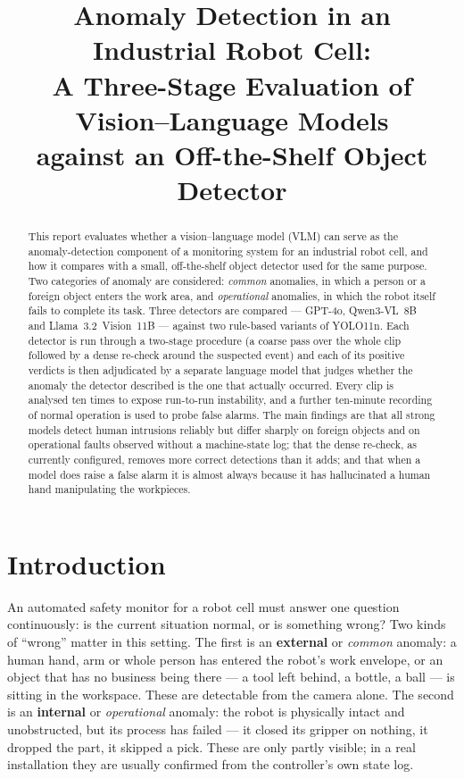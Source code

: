 \documentclass[11pt,a4paper]{article}
\title{Anomaly Detection in an Industrial Robot Cell:\\[4pt]
       A Three-Stage Evaluation of Vision--Language Models\\
       against an Off-the-Shelf Object Detector}
\author{}
\date{}
\begin{document}
\maketitle

\begin{abstract}
\noindent
This report evaluates whether a vision--language model (VLM) can serve as
the anomaly-detection component of a monitoring system for an industrial
robot cell, and how it compares with a small, off-the-shelf object
detector used for the same purpose. Two categories of anomaly are
considered: \emph{common} anomalies, in which a person or a foreign object
enters the work area, and \emph{operational} anomalies, in which the robot
itself fails to complete its task. Three detectors are compared --- GPT-4o,
Qwen3-VL~8B and Llama~3.2~Vision~11B --- against two rule-based variants of
YOLO11n. Each detector is run through a two-stage procedure (a coarse pass
over the whole clip followed by a dense re-check around the suspected
event) and each of its positive verdicts is then adjudicated by a separate
language model that judges whether the anomaly the detector described is
the one that actually occurred. Every clip is analysed ten times to expose
run-to-run instability, and a further ten-minute recording of normal
operation is used to probe false alarms. The main findings are that all
strong models detect human intrusions reliably but differ sharply on
foreign objects and on operational faults observed without a machine-state
log; that the dense re-check, as currently configured, removes more
correct detections than it adds; and that when a model does raise a false
alarm it is almost always because it has hallucinated a human hand
manipulating the workpieces.
\end{abstract}

\tableofcontents
\newpage

\section{Introduction}

An automated safety monitor for a robot cell must answer one question
continuously: is the current situation normal, or is something wrong? Two
kinds of ``wrong'' matter in this setting. The first is an
\textbf{external} or \emph{common} anomaly: a human hand, arm or whole
person has entered the robot's work envelope, or an object that has no
business being there --- a tool left behind, a bottle, a ball --- is
sitting in the workspace. These are detectable from the camera alone. The
second is an \textbf{internal} or \emph{operational} anomaly: the robot is
physically intact and unobstructed, but its process has failed --- it
closed its gripper on nothing, it dropped the part, it skipped a pick.
These are only partly visible; in a real installation they are usually
confirmed from the controller's own state log.
\end{document}
